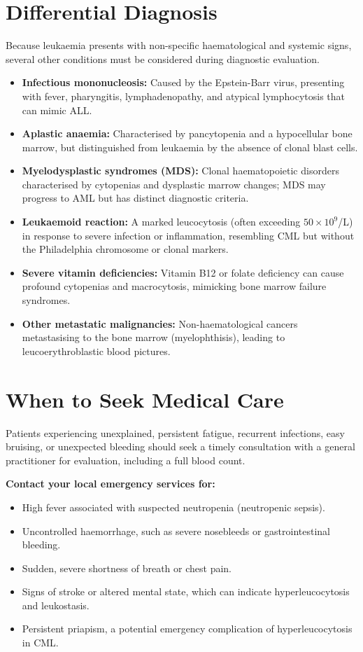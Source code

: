 \section*{Differential Diagnosis}
Because leukaemia presents with non-specific haematological and systemic signs, several other conditions must be considered during diagnostic evaluation.
\begin{itemize}
    \item \textbf{Infectious mononucleosis:} Caused by the Epstein-Barr virus, presenting with fever, pharyngitis, lymphadenopathy, and atypical lymphocytosis that can mimic ALL.
    \item \textbf{Aplastic anaemia:} Characterised by pancytopenia and a hypocellular bone marrow, but distinguished from leukaemia by the absence of clonal blast cells.
    \item \textbf{Myelodysplastic syndromes (MDS):} Clonal haematopoietic disorders characterised by cytopenias and dysplastic marrow changes; MDS may progress to AML but has distinct diagnostic criteria.
    \item \textbf{Leukaemoid reaction:} A marked leucocytosis (often exceeding $50 \times 10^9$/L) in response to severe infection or inflammation, resembling CML but without the Philadelphia chromosome or clonal markers.
    \item \textbf{Severe vitamin deficiencies:} Vitamin B12 or folate deficiency can cause profound cytopenias and macrocytosis, mimicking bone marrow failure syndromes.
    \item \textbf{Other metastatic malignancies:} Non-haematological cancers metastasising to the bone marrow (myelophthisis), leading to leucoerythroblastic blood pictures.
\end{itemize}

\section*{When to Seek Medical Care}
Patients experiencing unexplained, persistent fatigue, recurrent infections, easy bruising, or unexpected bleeding should seek a timely consultation with a general practitioner for evaluation, including a full blood count.

\textbf{Contact your local emergency services for:}
\begin{itemize}
    \item High fever associated with suspected neutropenia (neutropenic sepsis).
    \item Uncontrolled haemorrhage, such as severe nosebleeds or gastrointestinal bleeding.
    \item Sudden, severe shortness of breath or chest pain.
    \item Signs of stroke or altered mental state, which can indicate hyperleucocytosis and leukostasis.
    \item Persistent priapism, a potential emergency complication of hyperleucocytosis in CML.
\end{itemize}

